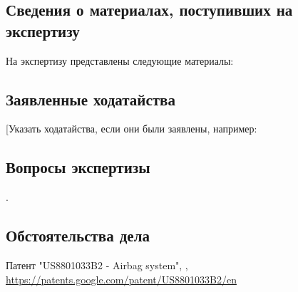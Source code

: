










\thispagestyle{empty}  %


\setcounter{page}{3}      %
\setcounter{figure}{2}    %
\setcounter{table}{5}     %
\setcounter{equation}{10} %




\subsection{Сведения о материалах, поступивших на экспертизу}
На экспертизу представлены следующие материалы:
%


\subsection{Заявленные ходатайства}
[Указать ходатайства, если они были заявлены, например: \\
%


\subsection{Вопросы экспертизы}.


\subsection{Обстоятельства дела}
%

\printbibliography
\par
Патент "US8801033B2 - Airbag system", \label{pat:1},  \url{https://patents.google.com/patent/US8801033B2/en}


